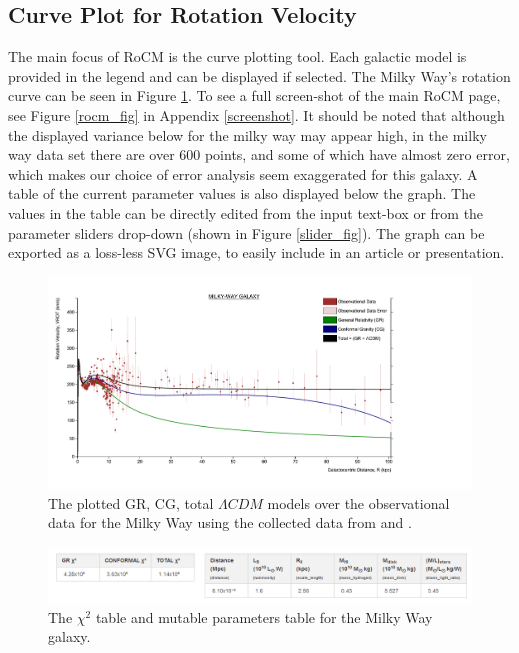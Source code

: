 \documentclass[conference]{IEEEtran-modified}
\begin{document}
\subsection{Curve Plot for Rotation Velocity}
The main focus of RoCM is the curve plotting tool. Each galactic model is provided in the legend and can be displayed if selected. The Milky Way's rotation curve can be seen in Figure \ref{milkywayplot}. To see a full screen-shot of the main RoCM page, see Figure \ref{rocm_fig} in Appendix \ref{screenshot}. It should be noted that although the displayed variance below for the milky way may appear high, in the milky way data set \cite{kundu} there are over 600 points, and some of which have almost zero error, which makes our choice of error analysis seem exaggerated for this galaxy. A table of the current parameter values is also displayed below the graph. The values in the table can be directly edited from the input text-box or from the parameter sliders drop-down (shown in Figure \ref{slider_fig}). The graph can be exported as a loss-less SVG image, to easily include in an article or presentation.

\begin{figure}[h!]
\centering
\includegraphics[width=\textwidth]{MILKY-WAY}
\caption{The plotted GR, CG, total $\Lambda CDM$ models over the observational data for the Milky Way using the collected data from \cite{kundu} and \cite{sofue}.}
\label{milkywayplot}
\end{figure}



\begin{figure}[h!]
\centering
\includegraphics[width=\textwidth]{MILKY-WAY-CHI-PARAMS}
\caption{The $\chi^2$ table and mutable parameters table for the Milky Way galaxy.}
\label{param_table_fig}
\end{figure}
\end{document}
